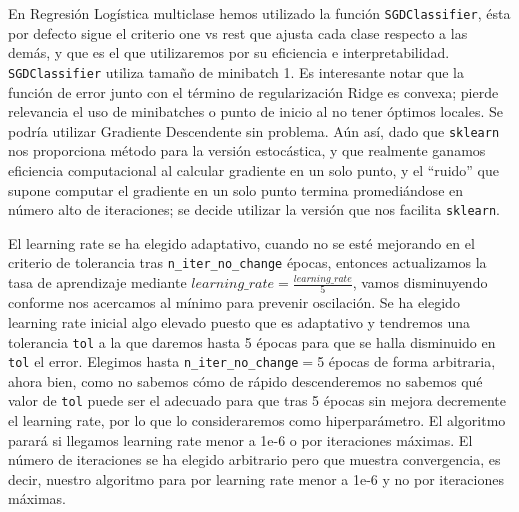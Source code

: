 \documentclass[11pt,a4paper]{article}
\theoremstyle{definition}
\begin{document}
	En Regresión Logística multiclase hemos utilizado la función \texttt{SGDClassifier}, ésta por defecto sigue el criterio one vs rest que ajusta cada clase respecto a las demás, y que es el que utilizaremos por su eficiencia e interpretabilidad. \texttt{SGDClassifier} utiliza tamaño de minibatch 1. Es interesante notar que la función de error junto con el término de regularización Ridge es convexa; pierde relevancia el uso de minibatches o punto de inicio al no tener óptimos locales. Se podría utilizar Gradiente Descendente sin problema. Aún así, dado que \texttt{sklearn} nos proporciona método para la versión estocástica, y que realmente ganamos eficiencia computacional al calcular gradiente en un solo punto, y el ``ruido'' que supone computar el gradiente en un solo punto termina promediándose en número alto de iteraciones; se decide utilizar la versión que nos facilita \texttt{sklearn}.
	
	 El learning rate se ha elegido adaptativo, cuando no se esté mejorando en el criterio de tolerancia tras \texttt{n\_iter\_no\_change} épocas, entonces actualizamos la tasa de aprendizaje mediante $learning\_rate =\frac{learning\_rate}{5}$, vamos disminuyendo conforme nos acercamos al mínimo para prevenir oscilación. Se ha elegido learning rate inicial algo elevado puesto que es adaptativo y  tendremos una tolerancia \texttt{tol} a la que daremos hasta 5 épocas para que se halla disminuido en \texttt{tol} el error. Elegimos hasta \texttt{n\_iter\_no\_change}$=$5 épocas de forma arbitraria, ahora bien, como no sabemos cómo de rápido descenderemos no sabemos qué valor de \texttt{tol} puede ser el adecuado para que tras 5 épocas sin mejora decremente el learning rate, por lo que lo consideraremos como hiperparámetro. El algoritmo parará si llegamos learning rate menor a 1e-6 o por iteraciones máximas. El número de iteraciones se ha elegido arbitrario pero que muestra convergencia, es decir, nuestro algoritmo para por learning rate menor a 1e-6 y no por iteraciones máximas.
	 
\end{document}
